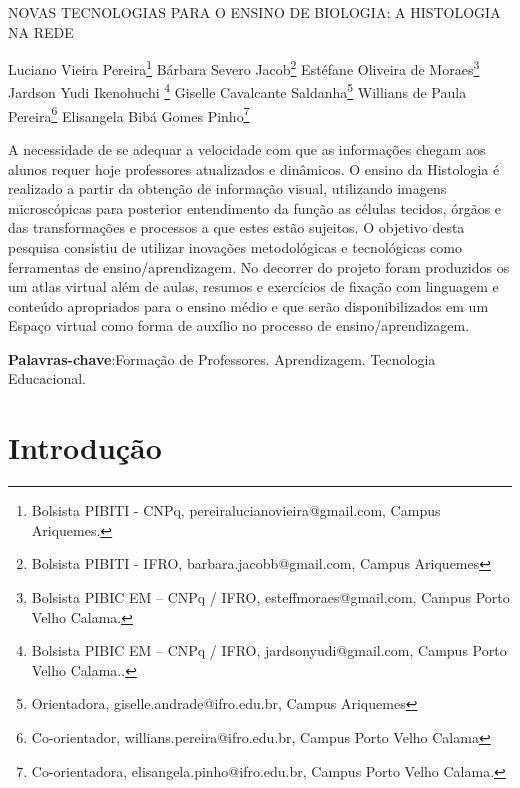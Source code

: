\documentclass[article,12pt,onesidea,4paper,english,brazil]{abntex2}
\begin{document}
	
	
	\frenchspacing 
	
	\begin{center}
		\LARGE 
		NOVAS TECNOLOGIAS PARA O ENSINO DE BIOLOGIA: A HISTOLOGIA NA REDE
		
		
		\normalsize
		Luciano Vieira Pereira\footnote{Bolsista PIBITI - CNPq, pereiralucianovieira@gmail.com, Campus Ariquemes.} 
		Bárbara Severo Jacob\footnote{Bolsista PIBITI - IFRO, barbara.jacobb@gmail.com, Campus Ariquemes} 
		Estéfane Oliveira de Moraes\footnote{Bolsista PIBIC EM – CNPq / IFRO, esteffmoraes@gmail.com, Campus Porto Velho Calama.} 
	Jardson Yudi Ikenohuchi \footnote{ Bolsista PIBIC EM – CNPq / IFRO, jardsonyudi@gmail.com, Campus Porto Velho Calama..} 
			Giselle Cavalcante Saldanha\footnote{Orientadora, giselle.andrade@ifro.edu.br, Campus Ariquemes}
				Willians de Paula Pereira\footnote{Co-orientador, willians.pereira@ifro.edu.br, Campus Porto Velho Calama}
				Elisangela Bibá Gomes Pinho\footnote{Co-orientadora, elisangela.pinho@ifro.edu.br, Campus Porto Velho Calama.}
	\end{center}
	
	\begin{resumoumacoluna}
	A necessidade de se adequar a velocidade com que as informações chegam aos alunos requer hoje professores atualizados e dinâmicos. O ensino da Histologia é realizado a partir da obtenção de informação visual, utilizando imagens microscópicas para posterior entendimento da função as células tecidos, órgãos e das transformações e processos a que estes estão sujeitos. O objetivo desta pesquisa consistiu de utilizar inovações metodológicas e tecnológicas como ferramentas de ensino/aprendizagem. No decorrer do projeto foram produzidos os um atlas virtual além de aulas, resumos e exercícios de fixação com linguagem e conteúdo apropriados para o ensino médio e que serão disponibilizados em um Espaço virtual como forma de auxílio no processo de ensino/aprendizagem.
		
		\vspace{\onelineskip}
		
		\noindent
		\textbf{Palavras-chave}:Formação de Professores. Aprendizagem. Tecnologia Educacional.
	\end{resumoumacoluna}
	
	\section*{Introdução}
	
\end{document}
